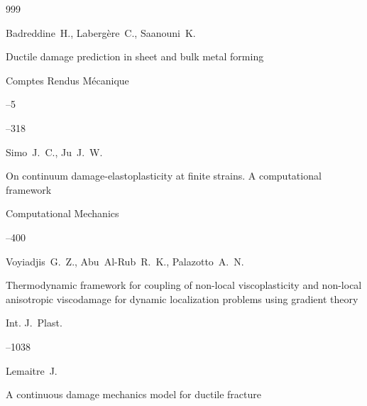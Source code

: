 \begin{thebibliography}{999}





\by Badreddine~H., Laberg\`ere~C., Saanouni~K. 

\paper Ductile damage prediction in sheet and bulk metal forming

\jour Comptes Rendus M\'ecanique



--5

--318






\by  Simo~J.~C., Ju~J.~W. 

\paper On continuum damage-elastoplasticity at finite strains. A computational framework

\jour Computational Mechanics  




--400





\by Voyiadjis~G.~Z., Abu~Al-Rub~R.~K., Palazotto~A.~N. 

\paper Thermodynamic framework for coupling of non-local viscoplasticity and non-local anisotropic viscodamage for dynamic localization problems using gradient theory

\jour Int. J.~Plast.




--1038






\by Lemaitre~J. 

\paper A continuous damage mechanics model for ductile fracture


\end{thebibliography}
